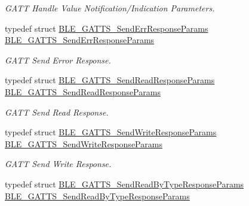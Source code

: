 \begin{DoxyCompactItemize}
\begin{DoxyCompactList}\small\item\em G\+A\+TT Handle Value Notification/\+Indication Parameters. \end{DoxyCompactList}\item 
typedef struct \hyperlink{struct_b_l_e___g_a_t_t_s___send_err_response_params}{B\+L\+E\+\_\+\+G\+A\+T\+T\+S\+\_\+\+Send\+Err\+Response\+Params} \hyperlink{group___b_l_e___g_a_t_t_ga6a58519105ef737c3e9ffad36cc0e6c4}{B\+L\+E\+\_\+\+G\+A\+T\+T\+S\+\_\+\+Send\+Err\+Response\+Params}\hypertarget{group___b_l_e___g_a_t_t_ga6a58519105ef737c3e9ffad36cc0e6c4}{}\label{group___b_l_e___g_a_t_t_ga6a58519105ef737c3e9ffad36cc0e6c4}

\begin{DoxyCompactList}\small\item\em G\+A\+TT Send Error Response. \end{DoxyCompactList}\item 
typedef struct \hyperlink{struct_b_l_e___g_a_t_t_s___send_read_response_params}{B\+L\+E\+\_\+\+G\+A\+T\+T\+S\+\_\+\+Send\+Read\+Response\+Params} \hyperlink{group___b_l_e___g_a_t_t_ga84b0e821d28e0b71da5e10ba78e83fc9}{B\+L\+E\+\_\+\+G\+A\+T\+T\+S\+\_\+\+Send\+Read\+Response\+Params}\hypertarget{group___b_l_e___g_a_t_t_ga84b0e821d28e0b71da5e10ba78e83fc9}{}\label{group___b_l_e___g_a_t_t_ga84b0e821d28e0b71da5e10ba78e83fc9}

\begin{DoxyCompactList}\small\item\em G\+A\+TT Send Read Response. \end{DoxyCompactList}\item 
typedef struct \hyperlink{struct_b_l_e___g_a_t_t_s___send_write_response_params}{B\+L\+E\+\_\+\+G\+A\+T\+T\+S\+\_\+\+Send\+Write\+Response\+Params} \hyperlink{group___b_l_e___g_a_t_t_ga429d9db17f28a460e8251902d9ad4200}{B\+L\+E\+\_\+\+G\+A\+T\+T\+S\+\_\+\+Send\+Write\+Response\+Params}\hypertarget{group___b_l_e___g_a_t_t_ga429d9db17f28a460e8251902d9ad4200}{}\label{group___b_l_e___g_a_t_t_ga429d9db17f28a460e8251902d9ad4200}

\begin{DoxyCompactList}\small\item\em G\+A\+TT Send Write Response. \end{DoxyCompactList}\item 
typedef struct \hyperlink{struct_b_l_e___g_a_t_t_s___send_read_by_type_response_params}{B\+L\+E\+\_\+\+G\+A\+T\+T\+S\+\_\+\+Send\+Read\+By\+Type\+Response\+Params} \hyperlink{group___b_l_e___g_a_t_t_ga57706da5db03112e5ea710f5fc7bc9e8}{B\+L\+E\+\_\+\+G\+A\+T\+T\+S\+\_\+\+Send\+Read\+By\+Type\+Response\+Params}\hypertarget{group___b_l_e___g_a_t_t_ga57706da5db03112e5ea710f5fc7bc9e8}{}\label{group___b_l_e___g_a_t_t_ga57706da5db03112e5ea710f5fc7bc9e8}


\end{DoxyCompactItemize}
